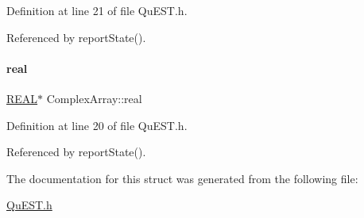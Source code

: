 Definition at line 21 of file Qu\+E\+S\+T.\+h.



Referenced by report\+State().

\mbox{\label{structComplexArray_a4195cac6c784ea1b6271f1c7dba1548a}} 
\paragraph{\texorpdfstring{real}{real}}
{\footnotesize\ttfamily \mbox{\hyperlink{QuEST__precision_8h_a4b654506f18b8bfd61ad2a29a7e38c25}{R\+E\+AL}}$\ast$ Complex\+Array\+::real}



Definition at line 20 of file Qu\+E\+S\+T.\+h.



Referenced by report\+State().



The documentation for this struct was generated from the following file\+:\begin{DoxyCompactItemize}
\item 
\mbox{\hyperlink{QuEST_8h}{Qu\+E\+S\+T.\+h}}\end{DoxyCompactItemize}
